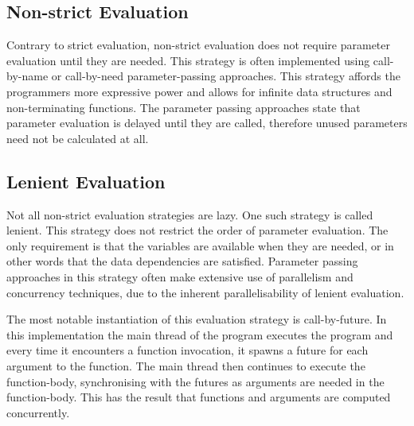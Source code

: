 \subsection{Non-strict Evaluation}
Contrary to strict evaluation, non-strict evaluation does not require parameter evaluation until they are needed\cite{hudak1989conception}. This strategy is often implemented using call-by-name or call-by-need parameter-passing approaches. This strategy affords the programmers more expressive power\cite{bird1997more} and allows for infinite data structures and non-terminating functions\cite[p.~103]{huttel2010transitions}. The parameter passing approaches state that parameter evaluation is delayed until they are called, therefore unused parameters need not be calculated at all.

\subsection{Lenient Evaluation}
Not all non-strict evaluation strategies are lazy. One such strategy is called lenient\cite{DBLP:journals/cl/Tremblay-lenient}. This strategy does not restrict the order of parameter evaluation. The only requirement is that the variables are available when they are needed, or in other words that the data dependencies are satisfied. Parameter passing approaches in this strategy often make extensive use of parallelism and concurrency techniques, due to the inherent parallelisability of lenient evaluation\cite{DBLP:journals/cl/Tremblay-parallel}.

The most notable instantiation of this evaluation strategy is call-by-future\cite{baker1977incremental}. In this implementation the main thread of the program executes the program and every time it encounters a function invocation, it spawns a future for each argument to the function. The main thread then continues to execute the function-body, synchronising with the futures as arguments are needed in the function-body. This has the result that functions and arguments are computed concurrently.


